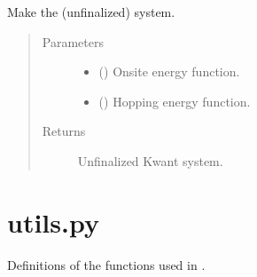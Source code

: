 \documentclass[letterpaper,10pt,english]{sphinxmanual}
\begin{document}
\begin{fulllineitems}
\begin{fulllineitems}
\label{\detokenize{modules:modules.system.DeviceSingleCorner.make_system}}
\pysigstartsignatures
{}
\pysigstopsignatures
\sphinxAtStartPar
Make the (unfinalized) system.
\begin{quote}\begin{description}
\item[{Parameters}] \leavevmode\begin{itemize}
\item {} 
\sphinxAtStartPar
{} () \textendash{} Onsite energy function.

\item {} 
\sphinxAtStartPar
{} () \textendash{} Hopping energy function.

\end{itemize}

\item[{Returns}] \leavevmode
\sphinxAtStartPar
Unfinalized Kwant system.

\end{description}\end{quote}

\end{fulllineitems}


\end{fulllineitems}



\section{utils.py}
\label{\detokenize{modules:module-modules.utils}}\label{\detokenize{modules:utils-py}}
\sphinxAtStartPar
Definitions of the functions used in .
\end{document}
